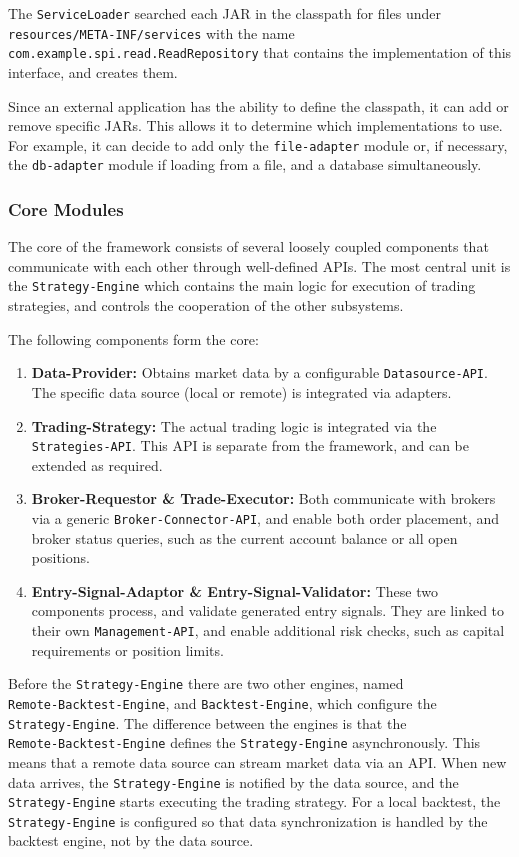 The \verb|ServiceLoader| searched each JAR in the classpath for files under \verb|resources/META-INF/services| with the name \\\verb|com.example.spi.read.ReadRepository| that contains the implementation of this interface, and creates them.

Since an external application has the ability to define the classpath, it can add or remove specific JARs.
This allows it to determine which implementations to use.
For example, it can decide to add only the \verb|file-adapter| module or, if necessary, the \verb|db-adapter| module if loading from a file, and a database simultaneously.

\subsubsection{Core Modules}

The core of the framework consists of several loosely coupled components that communicate with each other through well-defined APIs.
The most central unit is the \verb|Strategy-Engine| which contains the main logic for execution of trading strategies, and controls the cooperation of the other subsystems.

The following components form the core:

\begin{enumerate}
    \item \textbf{Data-Provider:} Obtains market data by a configurable \verb|Datasource-API|.
    The specific data source (local or remote) is integrated via adapters.
    \item \textbf{Trading-Strategy:} The actual trading logic is integrated via the \verb|Strategies-API|.
    This API is separate from the framework, and can be extended as required.
    \item \textbf{Broker-Requestor \& Trade-Executor:} Both communicate with brokers via a generic \verb|Broker-Connector-API|, and enable both order placement, and broker status queries, such as the current account balance or all open positions.
    \item \textbf{Entry-Signal-Adaptor \& Entry-Signal-Validator:} These two components process, and validate generated entry signals.
    They are linked to their own \verb|Management-API|, and enable additional risk checks, such as capital requirements or position limits.
\end{enumerate}

Before the \verb|Strategy-Engine| there are two other engines, named \\\verb|Remote-Backtest-Engine|, and \verb|Backtest-Engine|, which configure the \\\verb|Strategy-Engine|.
The difference between the engines is that the \\\verb|Remote-Backtest-Engine| defines the \verb|Strategy-Engine| asynchronously.
This means that a remote data source can stream market data via an API.
When new data arrives, the \verb|Strategy-Engine| is notified by the data source, and the \verb|Strategy-Engine| starts executing the trading strategy.
For a local backtest, the \verb|Strategy-Engine| is configured so that data synchronization is handled by the backtest engine, not by the data source.

